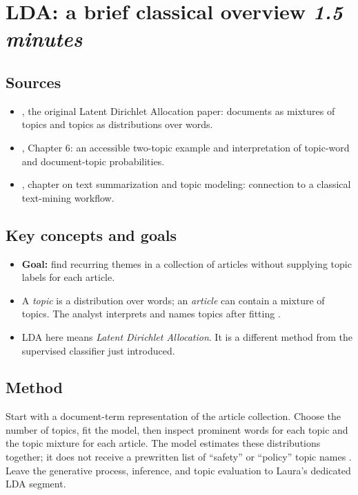 \documentclass[11pt]{article}
\begin{document}
\section[LDA: a brief classical overview]{LDA: a brief classical overview \hfill\normalsize\textit{1.5 minutes}}

\subsection*{Sources}
\begin{itemize}
  \item \textcite{blei2003}, the original Latent Dirichlet Allocation paper: documents as mixtures of topics and topics as distributions over words.
  \item \textcite{silgerobinson}, Chapter 6: an accessible two-topic example and interpretation of topic-word and document-topic probabilities.
  \item \textcite{qamar2024}, chapter on text summarization and topic modeling: connection to a classical text-mining workflow.
\end{itemize}

\subsection*{Key concepts and goals}
\begin{itemize}
  \item \textbf{Goal:} find recurring themes in a collection of articles without supplying topic labels for each article.
  \item A \emph{topic} is a distribution over words; an \emph{article} can contain a mixture of topics. The analyst interprets and names topics after fitting \parencite{blei2003,silgerobinson}.
  \item LDA here means \emph{Latent Dirichlet Allocation}. It is a different method from the supervised classifier just introduced.
\end{itemize}

\subsection*{Method}
Start with a document-term representation of the article collection. Choose the number of topics, fit the model, then inspect prominent words for each topic and the topic mixture for each article. The model estimates these distributions together; it does not receive a prewritten list of ``safety'' or ``policy'' topic names \parencite{blei2003,silgerobinson}. Leave the generative process, inference, and topic evaluation to Laura's dedicated LDA segment.
\end{document}
